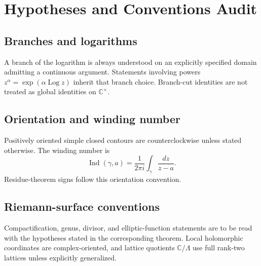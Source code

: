 \chapter*{Hypotheses and Conventions Audit}
{}

\section*{Branches and logarithms}
A branch of the logarithm is always understood on an explicitly specified
domain admitting a continuous argument.  Statements involving powers
\(z^\alpha=\exp(\alpha\operatorname{Log} z)\) inherit that branch choice.  Branch-cut
identities are not treated as global identities on \(\mathbb C^\times\).

\section*{Orientation and winding number}
Positively oriented simple closed contours are counterclockwise unless stated
otherwise.  The winding number is
\[
\operatorname{Ind}(\gamma,a)=\frac{1}{2\pi i}\int_\gamma\frac{dz}{z-a}.
\]
Residue-theorem signs follow this orientation convention.

\section*{Riemann-surface conventions}
Compactification, genus, divisor, and elliptic-function statements are to be
read with the hypotheses stated in the corresponding theorem.  Local
holomorphic coordinates are complex-oriented, and lattice quotients
\(\mathbb C/\Lambda\) use full rank-two lattices unless explicitly generalized.
